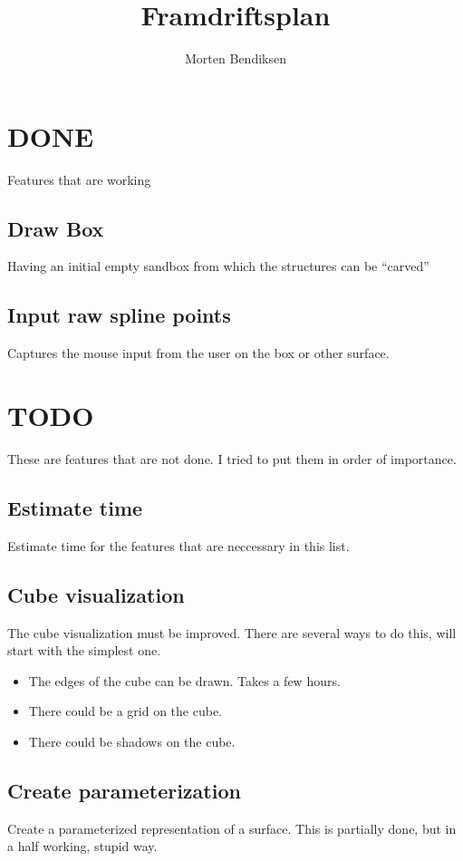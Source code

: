 \documentclass[a4paper,10pt]{article}
\title{Framdriftsplan}
\author{Morten Bendiksen}
\begin{document}
\maketitle

\begin{abstract}

\end{abstract}

\section{DONE}
Features that are working
\subsection{Draw Box}
Having an initial empty sandbox from which the structures can be ``carved''
\subsection{Input raw spline points}
Captures the mouse input from the user on the box or other surface.

\section{TODO}
These are features that are not done. I tried to put them in order of importance.
\subsection{Estimate time}
Estimate time for the features that are neccessary in this list.
\subsection{Cube visualization}
The cube visualization must be improved. There are several ways to do this, will start with the simplest one.
\begin{itemize}
 \item The edges of the cube can be drawn. Takes a few hours.
 \item There could be a grid on the cube.
 \item There could be shadows on the cube.
\end{itemize}
\subsection{Create parameterization}
Create a parameterized representation of a surface. This is partially done, but in a half working, stupid way.
\end{document}
